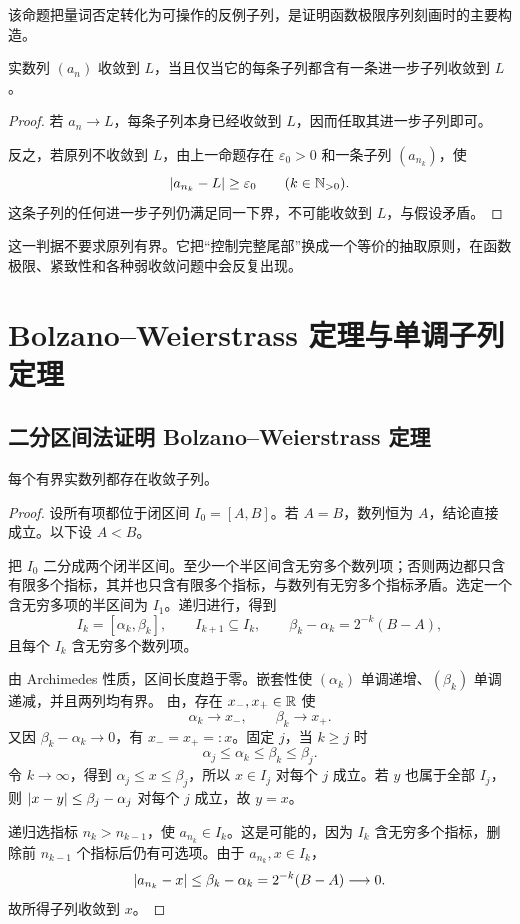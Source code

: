 该命题把量词否定转化为可操作的反例子列，是证明函数极限序列刻画时的主要构造。

\begin{theorem}[进一步子列判据]
实数列 \((a_n)\) 收敛到 \(L\)，当且仅当它的每条子列都含有一条进一步子列收敛到 \(L\)。
\end{theorem}

\begin{proof}
若 \(a_n\to L\)，每条子列本身已经收敛到 \(L\)，因而任取其进一步子列即可。

反之，若原列不收敛到 \(L\)，由上一命题存在
\(\varepsilon_0>0\) 和一条子列 \((a_{n_k})\)，使
\[
 \left|a_{n_k}-L\right|\ge\varepsilon_0\qquad(k\in\mathbb{N}_{>0}).
\]
这条子列的任何进一步子列仍满足同一下界，不可能收敛到 \(L\)，与假设矛盾。
\end{proof}

这一判据不要求原列有界。它把“控制完整尾部”换成一个等价的抽取原则，在函数极限、紧致性和各种弱收敛问题中会反复出现。

\section{Bolzano--Weierstrass 定理与单调子列定理}

\subsection{二分区间法证明 Bolzano--Weierstrass 定理}


\begin{theorem}
每个有界实数列都存在收敛子列。
\end{theorem}

\begin{proof}
设所有项都位于闭区间 \(I_0=[A,B]\)。若 \(A=B\)，数列恒为 \(A\)，结论直接成立。以下设 \(A<B\)。

把 \(I_0\) 二分成两个闭半区间。至少一个半区间含无穷多个数列项；否则两边都只含有限多个指标，其并也只含有限多个指标，与数列有无穷多个指标矛盾。选定一个含无穷多项的半区间为 \(I_1\)。递归进行，得到
\[
 I_k=[\alpha_k,\beta_k],\qquad
 I_{k+1}\subseteq I_k,\qquad
 \beta_k-\alpha_k=2^{-k}(B-A),
\]
且每个 \(I_k\) 含无穷多个数列项。

由 Archimedes 性质，区间长度趋于零。嵌套性使
\((\alpha_k)\) 单调递增、\((\beta_k)\) 单调递减，并且两列均有界。
由，存在 \(x_-,x_+\in\mathbb{R}\) 使
\[
 \alpha_k\to x_-,\qquad \beta_k\to x_+.
\]
又因 \(\beta_k-\alpha_k\to0\)，有 \(x_-=x_+=:x\)。固定 \(j\)，当
\(k\ge j\) 时
\[
 \alpha_j\le\alpha_k\le\beta_k\le\beta_j.
\]
令 \(k\to\infty\)，得到 \(\alpha_j\le x\le\beta_j\)，所以
\(x\in I_j\) 对每个 \(j\) 成立。若 \(y\) 也属于全部 \(I_j\)，则
\(\left|x-y\right|\le\beta_j-\alpha_j\) 对每个 \(j\) 成立，故 \(y=x\)。

递归选指标 \(n_k>n_{k-1}\)，使
\(a_{n_k}\in I_k\)。这是可能的，因为 \(I_k\) 含无穷多个指标，删除前 \(n_{k-1}\) 个指标后仍有可选项。由于 \(a_{n_k},x\in I_k\)，
\[
 \left|a_{n_k}-x\right|\le\beta_k-\alpha_k
 =2^{-k}(B-A)\longrightarrow0.
\]
故所得子列收敛到 \(x\)。
\end{proof}


